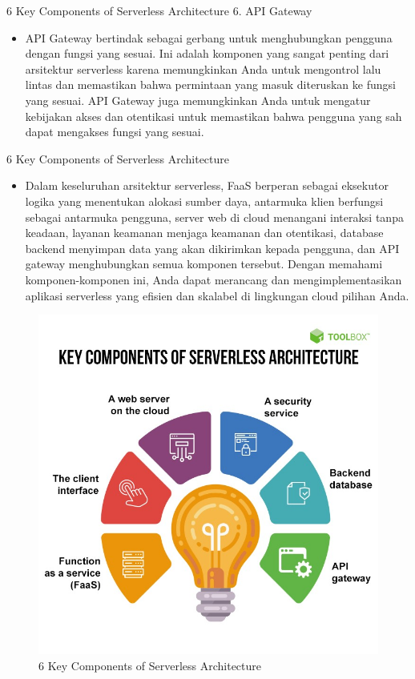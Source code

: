 \documentclass{beamer}
\begin{document}
    \begin{frame}{6 Key Components of Serverless Architecture}
    	6. API Gateway
        \begin{itemize}
            \item API Gateway bertindak sebagai gerbang untuk menghubungkan pengguna dengan fungsi yang sesuai. 
            Ini adalah komponen yang sangat penting dari arsitektur serverless karena memungkinkan Anda untuk mengontrol lalu lintas dan memastikan bahwa permintaan yang masuk diteruskan ke fungsi yang sesuai. 
            API Gateway juga memungkinkan Anda untuk mengatur kebijakan akses dan otentikasi untuk memastikan bahwa pengguna yang sah dapat mengakses fungsi yang sesuai.
        \end{itemize}
    \end{frame}

    \begin{frame}{6 Key Components of Serverless Architecture}
        \begin{itemize}
            \item Dalam keseluruhan arsitektur serverless, FaaS berperan sebagai eksekutor logika yang menentukan alokasi sumber daya, antarmuka klien berfungsi sebagai antarmuka pengguna, server web di cloud menangani interaksi tanpa keadaan, layanan keamanan menjaga keamanan dan otentikasi, database backend menyimpan data yang akan dikirimkan kepada pengguna, dan API gateway menghubungkan semua komponen tersebut. 
            Dengan memahami komponen-komponen ini, Anda dapat merancang dan mengimplementasikan aplikasi serverless yang efisien dan skalabel di lingkungan cloud pilihan Anda.
        \end{itemize}
    \end{frame}
    \begin{frame}
    	\begin{figure}
    		\includegraphics[width=0.8\linewidth]{komponen.jpg}
    		\centering
    		\caption{6 Key Components of Serverless Architecture}
    	\end{figure}
    \end{frame}
\end{document}
